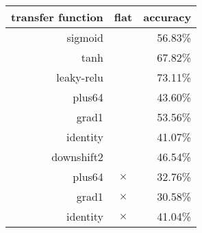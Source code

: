 \begin{tabular}{rcr}
{\bf transfer function} & {\bf flat} & {\bf accuracy} \\
\hline
sigmoid &   & 56.83\% \\
tanh &   & 67.82\% \\
leaky-relu &   & 73.11\% \\
plus64 &   & 43.60\% \\
grad1 &   & 53.56\% \\
identity &   & 41.07\% \\
downshift2 &   & 46.54\% \\
plus64 & $\times$ & 32.76\% \\
grad1 & $\times$ & 30.58\% \\
identity & $\times$ & 41.04\% \\
\end{tabular}
